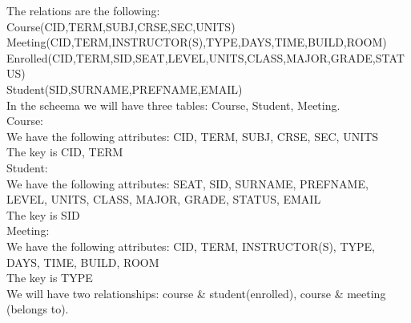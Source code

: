 

The relations are the following: \\

Course(CID,TERM,SUBJ,CRSE,SEC,UNITS) \\
Meeting(CID,TERM,INSTRUCTOR(S),TYPE,DAYS,TIME,BUILD,ROOM) \\
Enrolled(CID,TERM,SID,SEAT,LEVEL,UNITS,CLASS,MAJOR,GRADE,STATUS) \\
Student(SID,SURNAME,PREFNAME,EMAIL) \\

In the scheema we will have three tables: Course, Student, Meeting. \\

Course: \\
We have the following attributes: CID, TERM, SUBJ, CRSE, SEC, UNITS \\
The key is CID, TERM \\

Student: \\
We have the following attributes: SEAT, SID, SURNAME, PREFNAME, LEVEL, UNITS,
CLASS, MAJOR, GRADE, STATUS, EMAIL \\
The key is SID \\

Meeting:\\
We have the following attributes: CID, TERM, INSTRUCTOR(S), TYPE, DAYS, TIME, BUILD, ROOM\\
The key is TYPE \\

We will have two relationships: course & student(enrolled), course & meeting (belongs to). \\ 


